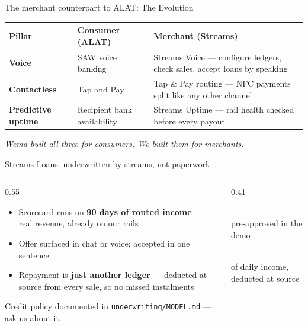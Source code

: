 \documentclass[aspectratio=169,11pt]{beamer}
\newcommand{\mutedtext}[1]{{\color{muted}#1}}
\newcommand{\kpi}[2]{{\centering{\color{brand}\Huge\bfseries #1}\\[2pt]\mutedtext{\small #2}\par}}
\begin{document}
\begin{frame}{The merchant counterpart to ALAT: The Evolution}
  \small
  \renewcommand{\arraystretch}{1.25}
  \begin{tabularx}{\textwidth}{@{}l X X@{}}
    \toprule
    \textbf{Pillar} & \textbf{Consumer (ALAT)} & \textbf{Merchant (Streams)}\\
    \midrule
    \textbf{Voice} & SAW voice banking & \alert{Streams Voice} — configure ledgers, check sales, accept loans by speaking\\
    \textbf{Contactless} & Tap and Pay & \alert{Tap \& Pay routing} — NFC payments split like any other channel\\
    \textbf{Predictive uptime} & Recipient bank availability & \alert{Streams Uptime} — rail health checked before every payout\\
    \bottomrule
  \end{tabularx}
  \vspace{0.25cm}
  \begin{center}
    \mutedtext{\emph{Wema built all three for consumers. We built them for merchants.}}
  \end{center}
\end{frame}

\begin{frame}{Streams Loans: underwritten by streams, not paperwork}
  \vspace{0.2cm}
  \begin{columns}[T]
    \begin{column}{0.55\textwidth}
      \begin{itemize}
        \item Scorecard runs on \textbf{90 days of routed income} — real revenue, already on our rails
        \item Offer surfaced in chat or voice; accepted in one sentence
        \item Repayment is \textbf{just another ledger} — deducted at source from every sale, so no missed instalments
      \end{itemize}
      \vspace{0.2cm}
      \mutedtext{\small Credit policy documented in \texttt{underwriting/MODEL.md} — ask us about it.}
    \end{column}
    \begin{column}{0.41\textwidth}
      \kpi{₦2,400,000}{pre-approved in the demo}
      \vspace{0.35cm}
      \kpi{6\%}{of daily income, deducted at source}
    \end{column}
  \end{columns}
\end{frame}
\end{document}
